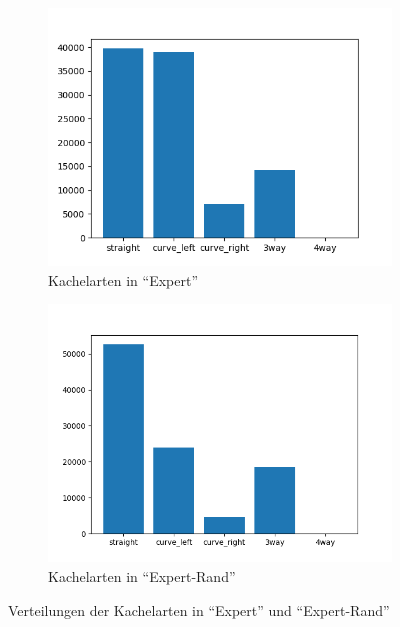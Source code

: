 \begin{figure}[H]
	\centering
	\begin{subfigure}[h]{0.5\textwidth}
		\centering
		\includegraphics[width=\linewidth]{kapitel4/images/plots/tiles-expert.png}
		\caption{Kachelarten in ``Expert''}
		\label{expert-drive-tiles}
	\end{subfigure}%
	\begin{subfigure}[h]{0.5\textwidth}
		\centering
		\includegraphics[width=\linewidth]{kapitel4/images/plots/tiles-expert-rand.png}
		\caption{Kachelarten in ``Expert-Rand''}
		\label{expert-rand-tiles}
	\end{subfigure}
	\caption{Verteilungen der Kachelarten in ``Expert'' und ``Expert-Rand''}
	\label{expert-tiles}
\end{figure}


